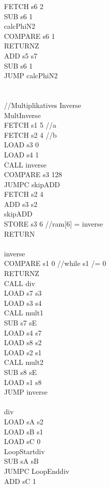 \documentclass{scrartcl}
\begin{document}
\begin{multicols*}{2}
FETCH s6 2\\
SUB s6 1\\
calcPhiN2\\
COMPARE s6 1\\
RETURNZ\\
ADD s5 s7\\
SUB s6 1\\
JUMP calcPhiN2\\
\\
\\
//Multiplikatives Inverse\\
MultInverse\\
FETCH s1 5 //a\\
FETCH s2 4 //b\\
LOAD s3 0\\
LOAD s4 1\\
CALL inverse\\
COMPARE s3 128\\
JUMPC skipADD\\
FETCH s2 4\\
ADD s3 s2\\
skipADD\\
STORE s3 6 //ram[6] = inverse\\
RETURN\\
\\
inverse\\
COMPARE s1 0 //while s1 /= 0\\
RETURNZ\\
CALL div\\
LOAD s7 s3\\
LOAD s3 s4\\
CALL mult1\\
SUB s7 sE\\
LOAD s4 s7\\
LOAD s8 s2\\
LOAD s2 s1\\
CALL mult2\\
SUB s8 sE\\
LOAD s1 s8\\
JUMP inverse\\
\\
div\\
LOAD sA s2\\
LOAD sB s1\\
LOAD sC 0\\
LoopStartdiv\\
SUB sA sB\\
JUMPC LoopEnddiv\\
ADD sC 1\\

\end{multicols*}
\end{document}
